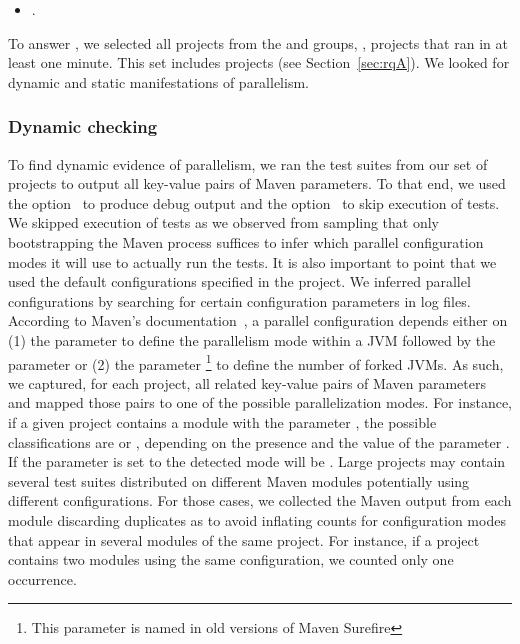 \begin{itemize}
    \item \numRQC. \textbf{\RQC{}}
\end{itemize}

To answer \numRQC{}, we selected all projects from the \medg{} and
\longg{} groups, \ie, projects that ran in at least one minute.  This
set includes \numMedLong{} projects (see Section~\ref{sec:rqA}).  We
looked for dynamic and static manifestations of parallelism.


\vspace{1ex}
\subsubsection{Dynamic checking}
\label{sec:rqC-1}

To find dynamic evidence of parallelism, we ran the test suites from
our set of \numMedLong{} projects to output all key-value pairs of
Maven parameters.  To that end, we used the option~ to
produce debug output and the option~ to skip
execution of tests.  We skipped execution of tests as we observed from
sampling that only bootstrapping the Maven process suffices to infer
which parallel configuration modes it will use to actually run the
tests.  It is also important to point that we used the default
configurations specified in the project.  We inferred parallel
configurations by searching for certain configuration parameters in
log files. According to Maven's
documentation~\cite{maven-surefire-plugin}, a parallel configuration
depends either on (1) the parameter  to define the
parallelism mode within a JVM followed by the parameter
 or (2) the parameter
\footnote{This parameter is named 
  in old versions of Maven Surefire} to define the number of forked
JVMs.  As such, we captured, for each project, all related key-value
pairs of Maven parameters and mapped those pairs to one of the
possible parallelization modes.  For instance, if a given project
contains a module with the parameter
, the possible classifications are
\ForkSeq{} or \ForkParMeth{}, depending on the presence and the value
of the parameter .  If the parameter
 is set to  the detected mode will be
\ForkParMeth{}.  Large projects may contain several test suites
distributed on different Maven modules potentially using different
configurations.  For those cases, we collected the Maven output from
each module discarding duplicates as to avoid inflating counts for
configuration modes that appear in several modules of the same
project. For instance, if a project contains two modules using the
same configuration, we counted only one occurrence.


